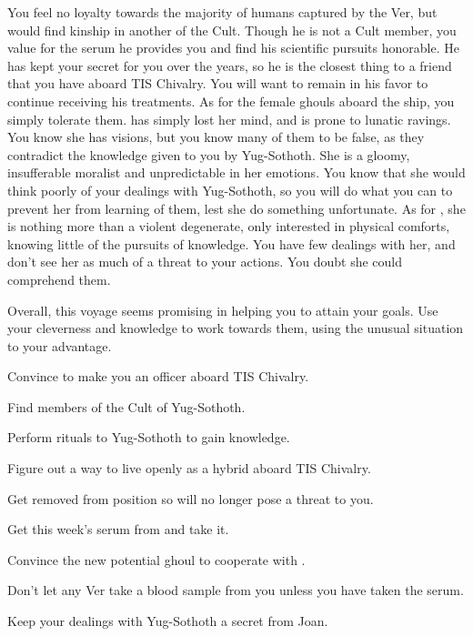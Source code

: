 \documentclass[char]{guildcamp4}
\begin{document}
You feel no loyalty towards the majority of humans captured by the Ver, but would find kinship in another of the Cult. Though he is not a Cult member, you value \cJames{} for the serum he provides you and find his scientific pursuits honorable. He has kept your secret for you over the years, so he is the closest thing to a friend that you have aboard TIS Chivalry. You will want to remain in his favor to continue receiving his treatments. As for the female ghouls aboard the ship, you simply tolerate them. \cJoan{} has simply lost her mind, and is prone to lunatic ravings. You know she has visions, but you know many of them to be false, as they contradict the knowledge given to you by Yug-Sothoth. She is a gloomy, insufferable moralist and unpredictable in her emotions. You know that she would think poorly of your dealings with Yug-Sothoth, so you will do what you can to prevent her from learning of them, lest she do something unfortunate. As for \cJulie{}, she is nothing more than a violent degenerate, only interested in physical comforts, knowing little of the pursuits of knowledge. You have few dealings with her, and don't see her as much of a threat to your actions. You doubt she could comprehend them.

Overall, this voyage seems promising in helping you to attain your goals. Use your cleverness and knowledge to work towards them, using the unusual situation to your advantage.

\begin{itemz}[Goals]
	\item Convince \cVone{} to make you an officer aboard TIS Chivalry.
	\item Find members of the Cult of Yug-Sothoth. 
	\item Perform rituals to Yug-Sothoth to gain knowledge.
	\item Figure out a way to live openly as a hybrid aboard TIS Chivalry.
	\item Get \cVthree{} removed from \cVthree{\their} position so \cVthree{\they} will no longer pose a threat to you.
	\item Get this week's serum from \cJames{} and take it.
	\item Convince the new potential ghoul to cooperate with \cVone{}.
	\item Don't let any Ver take a blood sample from you unless you have taken the serum.
	\item Keep your dealings with Yug-Sothoth a secret from Joan.
\end{itemz}
\end{document}
